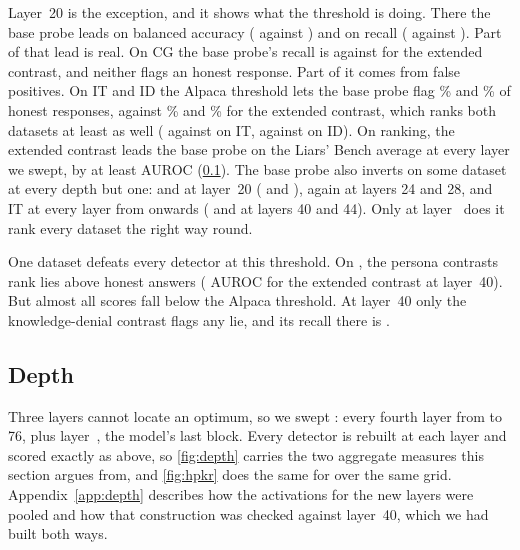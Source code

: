 Layer~20 is the exception, and it shows what the threshold is doing. There the base probe leads on
balanced accuracy ( against ) and on recall
( against ). Part of that lead is real. On CG the base
probe's recall is  against  for the extended contrast,
and neither flags an honest response. Part of it comes from false
positives. On IT and ID the Alpaca threshold lets the base probe flag \% and
\% of honest responses, against \% and \% for
the extended contrast, which ranks both datasets at least as well ( against
 on IT,  against  on ID). On ranking, the extended
contrast leads the base probe on the Liars' Bench average at every layer we swept, by at least
 AUROC (\cref{sec:depth}). The base probe also inverts on some
dataset at every depth but one: \hpc{} and \hpkr{} at layer~20 ( and
), \hpkr{} again at layers 24 and 28, and IT at every layer from
 onwards ( and  at layers 40
and 44). Only at layer~ does it rank every dataset the right way round.

One dataset defeats every detector at this threshold. On \hpc, the persona contrasts rank lies
above honest answers ( AUROC for the extended contrast at layer~40). But almost
all \hpc{} scores fall below the Alpaca threshold. At layer~40 only the knowledge-denial contrast
flags any \hpc{} lie, and its recall there is .

\subsection{Depth}
\label{sec:depth}

Three layers cannot locate an optimum, so we swept : every fourth layer from
 to 76, plus layer~, the model's last block. Every detector is rebuilt
at each layer and scored exactly as above, so \cref{fig:depth} carries the two aggregate measures
this section argues from, and \cref{fig:hpkr} does the same for \hpkr{} over the same grid.
Appendix~\ref{app:depth} describes how the activations for the new layers were pooled and how that
construction was checked against layer~40, which we had built both ways.

